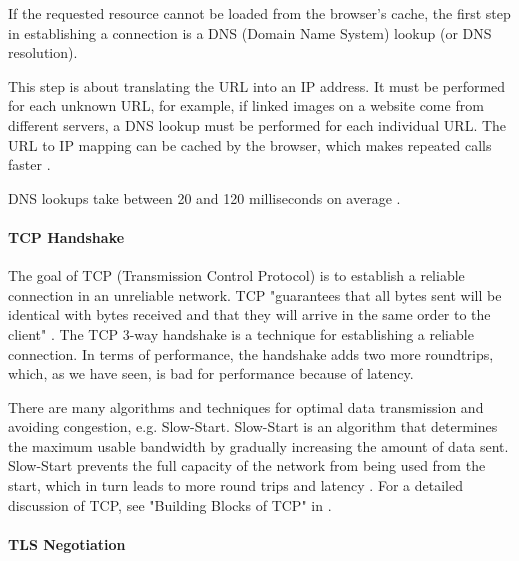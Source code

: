 If the requested resource cannot be loaded from the browser's cache, the first step in establishing a connection is a DNS (Domain Name System) lookup (or DNS resolution).

This step is about translating the URL into an IP address.
It must be performed for each unknown URL, for example, if linked images on a website come from different servers, a DNS lookup must be performed for each individual URL.
The URL to IP mapping can be cached by the browser, which makes repeated calls faster \cite{2021MDNHowBrowsersWork}.

DNS lookups take between 20 and 120 milliseconds on average \cite{2018KeyCDN}.





\paragraph{TCP Handshake} %

The goal of TCP (Transmission Control Protocol) is to establish a reliable connection in an unreliable network.
TCP  "guarantees that all bytes sent will be identical with bytes received and that they will arrive in the same order to the client" \cite{2013Grigorik}.
The TCP 3-way handshake is a technique for establishing a reliable connection.
In terms of performance, the handshake adds two more roundtrips, which, as we have seen, is bad for performance because of latency.

There are many algorithms and techniques for optimal data transmission and avoiding congestion, e.g. Slow-Start.
Slow-Start is an algorithm that determines the maximum usable bandwidth by gradually increasing the amount of data sent.
Slow-Start prevents the full capacity of the network from being used from the start, which in turn leads to more round trips and latency \cite{2013Grigorik}.
For a detailed discussion of TCP, see "Building Blocks of TCP" in \cite{2013Grigorik}.





\paragraph{TLS Negotiation} %


